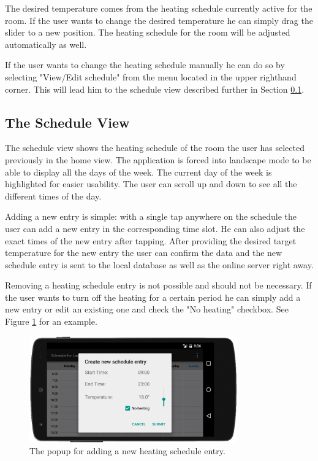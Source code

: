 The desired temperature comes from the heating schedule currently active for the room. If the user wants to change the desired temperature he can simply drag the slider to a new position. The heating schedule for the room will be adjusted automatically as well.

If the user wants to change the heating schedule manually he can do so by selecting "View/Edit schedule" from the menu located in the upper righthand corner. This will lead him to the schedule view described further in Section \ref{sec:schedule_view}. 

\subsection{The Schedule View}
\label{sec:schedule_view}
\label{sec:last_view}
The schedule view shows the heating schedule of the room the user has selected previously in the home view. The application is forced into landscape mode to be able to display all the days of the week. The current day of the week is highlighted for easier usability. The user can scroll up and down to see all the different times of the day. 

Adding a new entry is simple: with a single tap anywhere on the schedule the user can add a new entry in the corresponding time slot. He can also adjust the exact times of the new entry after tapping. After providing the desired target temperature for the new entry the user can confirm the data and the new schedule entry is sent to the local database as well as the online server right away. 

Removing a heating schedule entry is not possible and should not be necessary. If the user wants to turn off the heating for a certain period he can simply add a new entry or edit an existing one and check the "No heating" checkbox. See Figure \ref{fig:new_schedule_entry} for an example.

\begin{figure}
	\begin{center}
		\includegraphics[width=0.8\textwidth]{images/new_schedule_entry.png}
	\end{center}
	\caption{The popup for adding a new heating schedule entry.}
	\label{fig:new_schedule_entry}
\end{figure}

